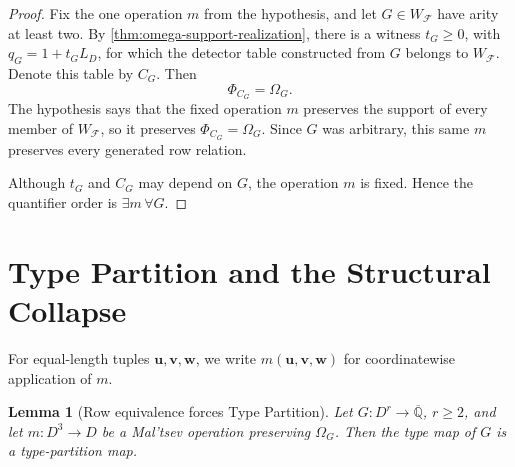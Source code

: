 \documentclass[11pt]{article}
\theoremstyle{plain}
\newtheorem{lemma}[lemma]{Lemma}
\theoremstyle{definition}
\theoremstyle{remark}
\newcommand{\AlgNums}{\overline{\mathbb Q}}
\newcommand{\cF}{\mathcal F}
\newcommand{\SuppRel}[1]{\Phi_{#1}}
\newcommand{\RowEq}[1]{\Omega_{#1}}
\begin{document}
\begin{proof}
Fix the one operation $m$ from the hypothesis, and let
$G\in W_{\cF}$ have arity at least two.  By
\cref{thm:omega-support-realization}, there is a witness $t_G\ge0$, with
$q_G=1+t_GL_D$, for which the detector table constructed from $G$ belongs
to $W_{\cF}$.  Denote this table by $C_G$.  Then
\[
  \SuppRel{C_G}=\RowEq G.
\]
The hypothesis says that the fixed operation $m$ preserves the support of
every member of $W_{\cF}$, so it preserves $\SuppRel{C_G}=\RowEq G$.
Since $G$ was arbitrary, this same $m$ preserves every generated row
relation.

Although $t_G$ and $C_G$ may depend on $G$, the operation $m$ is fixed.
Hence the quantifier order is $\exists m\,\forall G$.
\end{proof}

\section{Type Partition and the Structural Collapse}
\label{sec:type-collapse}

For equal-length tuples $\mathbf u,\mathbf v,\mathbf w$, we write
$m(\mathbf u,\mathbf v,\mathbf w)$ for coordinatewise application of $m$.

\begin{lemma}[Row equivalence forces Type Partition]
\label{lem:omega-implies-type}
Let $G:D^r\to\AlgNums$, $r\ge2$, and let $m:D^3\to D$ be a Mal'tsev
operation preserving $\RowEq G$.  Then the type map of $G$ is a
type-partition map.
\end{lemma}
\end{document}
